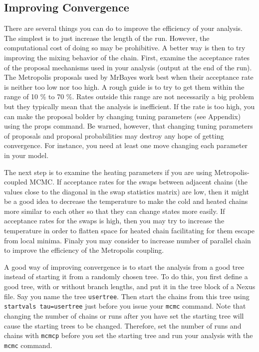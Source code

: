 \documentclass[12pt]{book}
\newcommand{\ttt}[1]{\texttt{#1}}
\begin{document}
\subsection{Improving Convergence}
There are several things you can do to improve the efficiency of your analysis. The simplest is to
just increase the length of the run. However, the computational cost of doing so may be
prohibitive. A better way is then to try improving the mixing behavior of the chain. First, examine
the acceptance rates of the proposal mechanisms used in your analysis (output at the end of the
run). The Metropolis proposals used by MrBayes work best when their acceptance rate is neither too
low nor too high. A rough guide is to try to get them within the range of 10 \% to 70 \%. Rates
outside this range are not necessarily a big problem but they typically mean that the analysis is
inefficient. If the rate is too high, you can make the proposal bolder by changing tuning
parameters (see Appendix) using the props command. Be warned, however, that changing tuning
parameters of proposals and proposal probabilities may destroy any hope of getting convergence. For
instance, you need at least one move changing each parameter in your model.

The next step is to examine the heating parameters if you are using Metropolis-coupled MCMC. If
acceptance rates for the swaps between adjacent chains (the values close to the diagonal in the
swap statistics matrix) are low, then it might be a good idea to decrease the temperature to make
the cold and heated chains more similar to each other so that they can change states more easily.
If acceptance rates for the swaps is high, then you may try to increase the temperature in order to
flatten space for heated chain facilitating for them escape from local minima. Finaly you may
consider to increase number of parallel chain to improve the efficiency of the Metropolis coupling.

A good way of improving convergence is to start the analysis from a good tree instead of starting
it from a randomly chosen tree. To do this, you first define a good tree, with or without branch
lengths, and put it in the tree block of a Nexus file. Say you name the tree \ttt{usertree}. Then
start the chains from this tree using \ttt{startvals tau=usertree} just before you issue your
\ttt{mcmc} command. Note that changing the number of chains or runs after you have set the starting
tree will cause the starting trees to be changed. Therefore, set the number of runs and chains with
\ttt{mcmcp} before you set the starting tree and run your analysis with the \ttt{mcmc} command.
\end{document}
